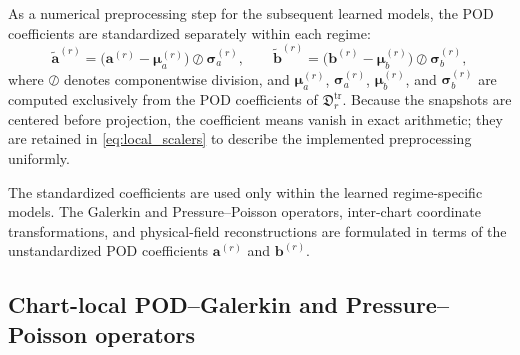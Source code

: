 As a numerical preprocessing step for the subsequent learned models, the
POD coefficients are standardized separately within each regime:
\begin{equation}
\widetilde{\boldsymbol{a}}^{(r)} = 
\bigl( \boldsymbol{a}^{(r)} - \boldsymbol{\mu}_{a}^{(r)} \bigr)
\oslash
\boldsymbol{\sigma}_{a}^{(r)},
\qquad
\widetilde{\boldsymbol{b}}^{(r)} = 
\bigl( \boldsymbol{b}^{(r)} - \boldsymbol{\mu}_{b}^{(r)} \bigr)
\oslash
\boldsymbol{\sigma}_{b}^{(r)},
\label{eq:local_scalers}
\end{equation}
where $\oslash$ denotes componentwise division, and
$\boldsymbol{\mu}_{a}^{(r)}$, $\boldsymbol{\sigma}_{a}^{(r)}$,
$\boldsymbol{\mu}_{b}^{(r)}$, and
$\boldsymbol{\sigma}_{b}^{(r)}$ are computed exclusively from the POD
coefficients of $\mathfrak{D}_{r}^{\mathrm{tr}}$.  Because the snapshots are
centered before projection, the coefficient means vanish in exact
arithmetic; they are retained in \eqref{eq:local_scalers} to describe the
implemented preprocessing uniformly.

The standardized coefficients are used only within the learned
regime-specific models.  The Galerkin and Pressure--Poisson operators,
inter-chart coordinate transformations, and physical-field reconstructions
are formulated in terms of the unstandardized POD coefficients
$\boldsymbol{a}^{(r)}$ and $\boldsymbol{b}^{(r)}$.










\subsection{Chart-local POD--Galerkin and Pressure--Poisson operators}
\label{subsec:local_galerkin_pressure_poisson}

